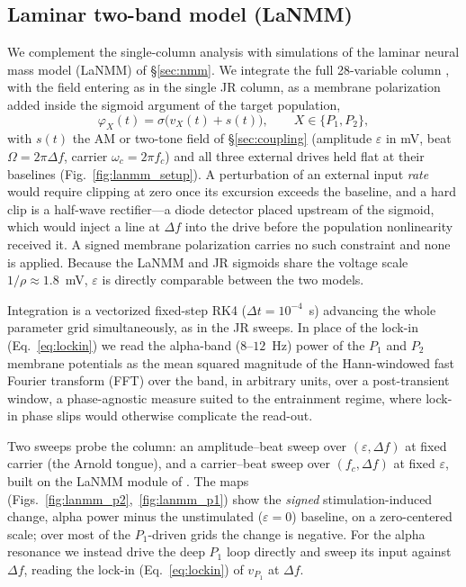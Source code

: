 \documentclass[11pt,a4paper]{article}
\newcommand{\Sig}{\sigma}
\begin{document}
\subsection{Laminar two-band model (LaNMM)}
We complement the single-column analysis with simulations of the laminar neural
mass model (LaNMM) of \S\ref{sec:nmm}. We integrate the full 28-variable column
\cite{ruffini2025cfc,sanchezTodo2023}, with the field entering as in the single
JR column, as a membrane polarization added inside the sigmoid argument of the target
population,
\begin{equation}
\varphi_X(t)=\Sig\!\big(v_X(t)+s(t)\big),\qquad X\in\{P_1,P_2\},
\label{eq:lanmm_drive}
\end{equation}
with $s(t)$ the AM or two-tone field of \S\ref{sec:coupling} (amplitude $\varepsilon$ in
mV, beat $\Omega=2\pi\Delta f$, carrier $\omega_c=2\pi f_c$) and all three external drives
held flat at their baselines (Fig.~\ref{fig:lanmm_setup}). A perturbation of an external
input \emph{rate} would require clipping at zero
once its excursion exceeds the baseline, and a hard clip is a half-wave rectifier---a
diode detector placed upstream of the sigmoid, which would inject a line at $\Delta f$
into the drive before the population nonlinearity received it. A signed membrane
polarization carries no such constraint and none is applied. Because the LaNMM and JR
sigmoids share the voltage scale $1/\rho\approx1.8$~mV, $\varepsilon$ is directly
comparable between the two models.

Integration is a vectorized fixed-step RK4
($\Delta t=10^{-4}$~s) advancing the whole parameter grid simultaneously, as in the JR
sweeps. In place of the lock-in (Eq.~\eqref{eq:lockin}) we read the
alpha-band ($8$--$12$~Hz) power of the $P_1$ and $P_2$ membrane potentials as the mean
squared magnitude of the Hann-windowed fast Fourier transform (FFT) over the band, in arbitrary units, over a
post-transient window, a phase-agnostic measure suited to the entrainment regime, where
lock-in phase slips would otherwise complicate the read-out.

Two sweeps probe the column: an amplitude--beat sweep over
$(\varepsilon,\Delta f)$ at fixed carrier (the Arnold tongue), and a carrier--beat sweep
over $(f_c,\Delta f)$ at fixed $\varepsilon$, built on the LaNMM module of
\cite{ruffini2025cfc}. The maps
(Figs.~\ref{fig:lanmm_p2},~\ref{fig:lanmm_p1}) show the \emph{signed} stimulation-induced
change, alpha power minus the unstimulated ($\varepsilon=0$) baseline, on a zero-centered
scale; over most of the $P_1$-driven grids the change is negative. For the
alpha resonance we instead drive the deep $P_1$ loop directly and sweep its input against
$\Delta f$, reading the lock-in (Eq.~\eqref{eq:lockin}) of $v_{P_1}$ at $\Delta f$.
\end{document}
